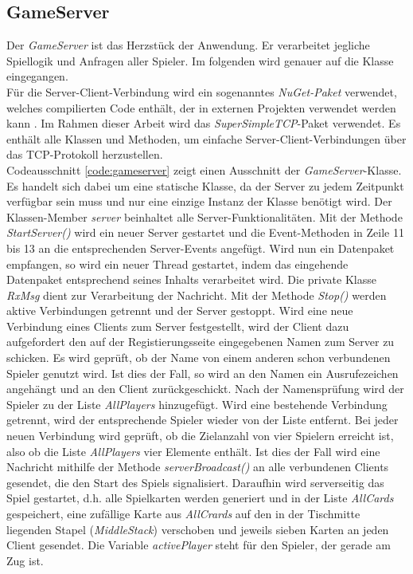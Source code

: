 \subsection{GameServer}
Der \textit{GameServer} ist das Herzstück der Anwendung. Er verarbeitet jegliche Spiellogik und Anfragen aller Spieler. Im folgenden wird genauer auf die Klasse eingegangen.\\
Für die Server-Client-Verbindung wird ein sogenanntes \textit{NuGet-Paket} verwendet, welches compilierten Code enthält, der in externen Projekten verwendet werden kann 
\cite{Nuget}. 
Im Rahmen dieser Arbeit wird das \textit{SuperSimpleTCP}-Paket verwendet. Es enthält alle Klassen und Methoden, um einfache Server-Client-Verbindungen über das TCP-Protokoll herzustellen.\\
Codeausschnitt \ref{code:gameserver} zeigt einen Ausschnitt der \textit{GameServer}-Klasse. Es handelt sich dabei um eine statische Klasse, da der Server zu jedem Zeitpunkt verfügbar sein muss und nur eine einzige Instanz der Klasse benötigt wird. Der Klassen-Member \textit{server} beinhaltet alle Server-Funktionalitäten. Mit der Methode \textit{StartServer()} wird ein neuer Server gestartet und die Event-Methoden in Zeile 11 bis 13 an die entsprechenden Server-Events angefügt. Wird nun ein Datenpaket empfangen, so wird ein neuer Thread gestartet, indem das eingehende Datenpaket entsprechend seines Inhalts verarbeitet wird. Die private Klasse \textit{RxMsg} dient zur Verarbeitung der Nachricht. Mit der Methode \textit{Stop()} werden aktive Verbindungen getrennt und der Server gestoppt. Wird eine neue Verbindung eines Clients zum Server festgestellt, wird der Client dazu aufgefordert den auf der Registierungsseite eingegebenen Namen zum Server zu schicken. Es wird geprüft, ob der Name von einem anderen schon verbundenen Spieler genutzt wird. Ist dies der Fall, so wird an den Namen ein Ausrufezeichen angehängt und an den Client zurückgeschickt. Nach der Namensprüfung wird der Spieler zu der Liste \textit{AllPlayers} hinzugefügt. Wird eine bestehende Verbindung getrennt, wird der entsprechende Spieler wieder von der Liste entfernt. Bei jeder neuen Verbindung wird geprüft, ob die Zielanzahl von vier Spielern erreicht ist, also ob die Liste \textit{AllPlayers} vier Elemente enthält. Ist dies der Fall wird eine Nachricht mithilfe der Methode \textit{serverBroadcast()} an alle verbundenen Clients gesendet, die den Start des Spiels signalisiert. Daraufhin wird serverseitig das Spiel gestartet, d.h. alle Spielkarten werden generiert und in der Liste \textit{AllCards} gespeichert, eine zufällige Karte aus \textit{AllCrards} auf den in der Tischmitte liegenden Stapel (\textit{MiddleStack}) verschoben und jeweils sieben Karten an jeden Client gesendet. Die Variable \textit{activePlayer} steht für den Spieler, der gerade am Zug ist.
